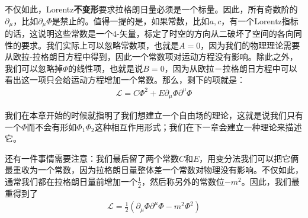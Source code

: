 不仅如此，Lorentz{\bf 不变形}要求拉格朗日量必须是一个标量。因此，所有奇数阶的$\partial_\mu$，比如$\partial_\mu\Phi$是禁止的。值得一提的是，如果常数，比如$a, c$，有一个Lorentz指标的话，这说明这些常数是一个$4$-矢量，标定了时空的方向从二破坏了空间的各向同性的要求。我们实际上可以忽略常数项，也就是$A=0$，因为我们的物理理论需要从欧拉-拉格朗日方程中得到，因此一个常数项对运动方程没有影响。除此之外，我们可以忽略掉$\Phi$的线性项，也就是说$B=0$，因为从欧拉－拉格朗日方程中可以看出这一项只会给运动方程增加一个常数。那么，剩下的项就是：
\begin{align}
\mathcal{L}=C\Phi^2+E\partial_\mu\Phi\partial^\mu\Phi
\end{align}

我们在本章开始的时候就指明了我们想建立一个自由场的理论，这就是说我们只有一个$\Phi$而不会有形如$\Phi_1\Phi_2$这种相互作用形式；我们在下一章会建立一种理论来描述它。

还有一件事情需要注意：我们最后留了两个常数$C$和$E$，用变分法我们可以把它俩最重收为一个常数，因为拉格朗日量整体差一个常数对物理没有影响。不仅如此，通常我们都在拉格朗日量前增加一个$\frac{1}{2}$，然后称另外的常数位$-m^2$。因此，我们最重得到了
\begin{align}
\mathcal{L}=\frac{1}{2}(\partial_\mu\Phi\partial^\mu\Phi-m^2\Phi^2)
\end{align}

